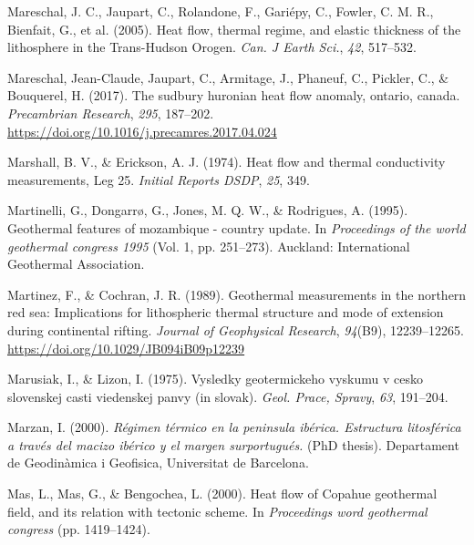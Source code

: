 \documentclass[draft,linenumbers]{agujournal2018}
\begin{document}
\leavevmode{}%
Mareschal, J. C., Jaupart, C., Rolandone, F., Gariépy, C., Fowler, C. M.
R., Bienfait, G., et al. (2005). Heat flow, thermal regime, and elastic
thickness of the lithosphere in the {Trans-Hudson Orogen}. \emph{Can. J
Earth Sci.}, \emph{42}, 517--532.

\leavevmode{}%
Mareschal, Jean-Claude, Jaupart, C., Armitage, J., Phaneuf, C., Pickler,
C., \& Bouquerel, H. (2017). The sudbury huronian heat flow anomaly,
ontario, canada. \emph{Precambrian Research}, \emph{295}, 187--202.
\url{https://doi.org/10.1016/j.precamres.2017.04.024}

\leavevmode{}%
Marshall, B. V., \& Erickson, A. J. (1974). Heat flow and thermal
conductivity measurements, {Leg} 25. \emph{Initial Reports DSDP},
\emph{25}, 349.

\leavevmode{}%
Martinelli, G., Dongarrø, G., Jones, M. Q. W., \& Rodrigues, A. (1995).
Geothermal features of mozambique - country update. In \emph{Proceedings
of the world geothermal congress 1995} (Vol. 1, pp. 251--273). Auckland:
International Geothermal Association.

\leavevmode{}%
Martinez, F., \& Cochran, J. R. (1989). Geothermal measurements in the
northern red sea: Implications for lithospheric thermal structure and
mode of extension during continental rifting. \emph{Journal of
Geophysical Research}, \emph{94}(B9), 12239--12265.
\url{https://doi.org/10.1029/JB094iB09p12239}

\leavevmode{}%
Marusiak, I., \& Lizon, I. (1975). Vysledky geotermickeho vyskumu v
cesko slovenskej casti viedenskej panvy (in slovak). \emph{Geol. Prace,
Spravy}, \emph{63}, 191--204.

\leavevmode{}%
Marzan, I. (2000). \emph{Régimen térmico en la peninsula ibérica.
Estructura litosférica a través del macizo ibérico y el margen
surportugués.} (PhD thesis). Departament de Geodinàmica i Geofisica,
Universitat de Barcelona.

\leavevmode{}%
Mas, L., Mas, G., \& Bengochea, L. (2000). Heat flow of {Copahue}
geothermal field, and its relation with tectonic scheme. In
\emph{Proceedings word geothermal congress} (pp. 1419--1424).
\end{document}

